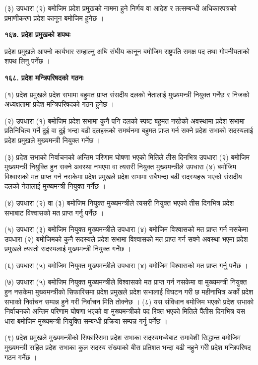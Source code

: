 (३) उपधारा (२) बमोजिम प्रदेश प्रमुखको नाममा हुने निर्णय वा आदेश र तत्सम्बन्धी अधिकारपत्रको प्रमाणीकरण प्रदेश कानून बमोजिम
हुनेछ ।

\textbf{१६७. प्रदेश प्रमुखको शपथः}

प्रदेश प्रमुखले आफ्नो कार्यभार सम्हाल्नु अघि संघीय कानून बमोजिम राष्ट्रपति समक्ष पद तथा गोपनीयताको शपथ लिनु पर्नेछ ।

\textbf{१६८. प्रदेश मन्त्रिपरिषदको गठनः}

(१) प्रदेश प्रमुखले प्रदेश सभामा बहुमत प्राप्त संसदीय दलको नेतालाई मुख्यमन्त्री नियुक्त गर्नेछ र निजको अध्यक्षतामा प्रदेश मन्त्रिपरिषदको गठन हुनेछ ।

(२) उपधारा (१) बमोजिम प्रदेश सभामा कुनै पनि दलको स्पष्ट बहुमत नरहेको अवस्थामा प्रदेश सभामा प्रतिनिधित्व गर्ने दुई वा दुई भन्दा
बढी दलहरूको समर्थनमा बहुमत प्राप्त गर्न सक्ने प्रदेश सभाको सदस्यलाई प्रदेश प्रमुखले मुख्यमन्त्री नियुक्त गर्नेछ ।

(३) प्रदेश सभाको निर्वाचनको अन्तिम परिणाम घोषणा भएको मितिले तीस दिनभित्र उपधारा (२) बमोजिम मुख्यमन्त्री नियुक्ति हुन सक्ने अवस्था नभएमा वा त्यसरी नियुक्त मुख्यमन्त्रीले उपधारा (४) बमोजिम विश्वासको मत प्राप्त गर्न नसकेमा प्रदेश प्रमुखले प्रदेश सभामा सबैभन्दा बढी सदस्यहरू भएको संसदीय दलको नेतालाई मुख्यमन्त्री नियुक्त गर्नेछ ।

(४) उपधारा (२) वा (३) बमोजिम नियुक्त मुख्यमन्त्रीले त्यसरी नियुक्त भएको तीस दिनभित्र प्रदेश सभाबाट विश्वासको मत प्राप्त गर्नु पर्नेछ ।

(५) उपधारा (३) बमोजिम नियुक्त मुख्यमन्त्रीले उपधारा (४) बमोजिम विश्वासको मत प्राप्त गर्न नसकेमा उपधारा (२) बमोजिमको कुनै सदस्यले प्रदेश सभामा विश्वासको मत प्राप्त गर्न सक्ने अवस्था भएमा प्रदेश प्रमुखले त्यस्तो सदस्यलाई मुख्यमन्त्री नियुक्त गर्नेछ ।

(६) उपधारा (५) बमोजिम नियुक्त मुख्यमन्त्रीले उपधारा (४) बमोजिम विश्वासको मत प्राप्त गर्नु पर्नेछ ।

(७) उपधारा (५) बमोजिम नियुक्त मुख्यमन्त्रीले विश्वासको मत प्राप्त गर्न नसकेमा वा मुख्यमन्त्री नियुक्त हुन नसकेमा मुख्यमन्त्रीको सिफारिसमा प्रदेश प्रमुखले प्रदेश सभालाई विघटन गरी छ महीनाभित्र अर्को प्रदेश सभाको निर्वाचन सम्पन्न हुने गरी निर्वाचन मिति तोक्नेछ ।
(८) यस संविधान बमोजिम भएको प्रदेश सभाको निर्वाचनको अन्तिम परिणाम घोषणा भएको वा मुख्यमन्त्रीको पद रिक्त भएको मितिले पैंतीस दिनभित्र यस धारा बमोजिम मुख्यमन्त्री नियुक्ति सम्बन्धी प्रक्रिया सम्पन्न गर्नु पर्नेछ ।

(९) प्रदेश प्रमुखले मुख्यमन्त्रीको सिफारिसमा प्रदेश सभाका सदस्यमध्येबाट समावेशी सिद्धान्त बमोजिम मुख्यमन्त्री सहित प्रदेश सभाका
कुल सदस्य संख्याको बीस प्रतिशत भन्दा बढी नहुने गरीे प्रदेश मन्त्रिपरिषद गठन गर्नेछ ।

